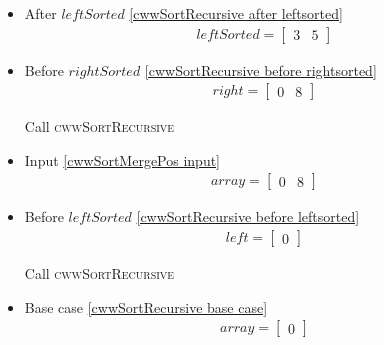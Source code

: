 \begin{frame}[containsverbatim]{\cwwalgortihmexampleframe}
\begin{columns}[c]
\begin{column}{0.65\textwidth}
{\begin{minipage}[c]{\textwidth}
\begin{multicols}{3}
\begin{itemize}
                                    \item After $leftSorted$ \cref{cwwSortRecursive after leftsorted}
                                    \begin{align*}
                                        leftSorted = \begin{bmatrix}3 & 5\end{bmatrix}
                                    \end{align*}
        
                                    \item Before $rightSorted$ \cref{cwwSortRecursive before rightsorted}
                                    \begin{align*}
                                        right = \begin{bmatrix}0 & 8\end{bmatrix}
                                    \end{align*}
        
                                    Call \textsc{cwwSortRecursive}
        
                                    \item Input \cref{cwwSortMergePos input}
                                    \begin{align*}
                                        array = \begin{bmatrix}0 & 8\end{bmatrix}
                                    \end{align*}
        
                                    \item Before $leftSorted$ \cref{cwwSortRecursive before leftsorted}
                                    \begin{align*}
                                        left = \begin{bmatrix}0\end{bmatrix}
                                    \end{align*}
        
                                    Call \textsc{cwwSortRecursive}
        
                                    \item Base case \cref{cwwSortRecursive base case}
                                    \begin{align*}
                                        array = \begin{bmatrix}0\end{bmatrix}
                                    \end{align*}
        

\end{itemize}
\end{multicols}
\end{minipage}}
\end{column}
\end{columns}
\end{frame}
